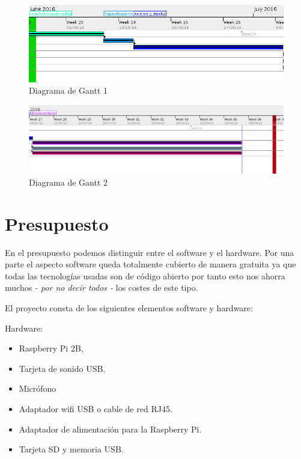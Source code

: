 \begin{figure}[!ht]
  \begin{center}
    \includegraphics[width=1\textwidth]{../images/diag_plan/gantt1.png}
    \caption{Diagrama de Gantt 1}
    \label{fig:gantt1}
  \end{center}
\end{figure}

\begin{figure}[!ht]
  \begin{center}
    \includegraphics[width=1\textwidth]{../images/diag_plan/gantt2.png}
    \caption{Diagrama de Gantt 2}
    \label{fig:gantt2}
  \end{center}
\end{figure}

\newpage

\section{Presupuesto}
\label{presupuesto}

En el presupuesto podemos distinguir entre el software y el hardware. Por una parte el aspecto software queda totalmente cubierto de manera gratuita ya que todas las tecnologías usadas son de código abierto por tanto esto nos ahorra muchos \textit{- por no decir todos -} los costes de este tipo.

\bigskip
El proyecto consta de los siguientes elementos software y hardware:

\bigskip
Hardware:
\begin{itemize}
	\item Raspberry Pi 2B,
	\item Tarjeta de sonido USB.
	\item Micrófono
	\item Adaptador wifi USB o cable de red RJ45.
	\item Adaptador de alimentación para la Raspberry Pi.
	\item Tarjeta SD y memoria USB.
\end{itemize}


